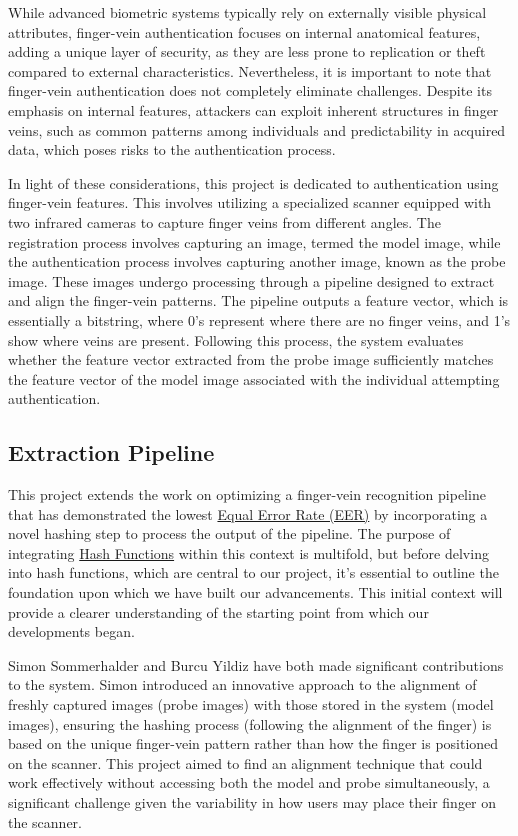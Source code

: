 While advanced biometric systems typically rely on externally visible physical attributes, finger-vein authentication focuses on internal anatomical features, adding a unique layer of security, as they are less prone to replication or theft compared to external characteristics. Nevertheless, it is important to note that finger-vein authentication does not completely eliminate challenges. Despite its emphasis on internal features, attackers can exploit inherent structures in finger veins, such as common patterns among individuals and predictability in acquired data, which poses risks to the authentication process.

In light of these considerations, this project is dedicated to authentication using finger-vein features.
This involves utilizing a specialized scanner equipped with two infrared cameras to capture finger veins from different angles.
The registration process involves capturing an image, termed the model image, while the authentication process involves capturing another image, known as the probe image. These images undergo processing through a pipeline designed to extract and align the finger-vein patterns.
The pipeline outputs a feature vector, which is essentially a bitstring, where 0's represent where there are no finger veins, and 1's show where veins are present.
Following this process, the system evaluates whether the feature vector extracted from the probe image sufficiently matches the feature vector of the model image associated with the individual attempting authentication.

\subsection{Extraction Pipeline}\label{sec:extraction-pipeline}

This project extends the work on optimizing a finger-vein recognition pipeline that has demonstrated the lowest \hyperref[def:EER]{Equal Error Rate (EER)} by incorporating a novel hashing step to process the output of the pipeline. The purpose of integrating \hyperref[def:Hash_Function]{Hash Functions} within this context is multifold, but before delving into hash functions, which are central to our project, it's essential to outline the foundation upon which we have built our advancements. This initial context will provide a clearer understanding of the starting point from which our developments began.

Simon Sommerhalder and Burcu Yildiz have both made significant contributions to the system. Simon introduced an innovative approach to the alignment of freshly captured images (probe images) with those stored in the system (model images), ensuring the hashing process (following the alignment of the finger) is based on the unique finger-vein pattern rather than how the finger is positioned on the scanner. This project aimed to find an alignment technique that could work effectively without accessing both the model and probe simultaneously, a significant challenge given the variability in how users may place their finger on the scanner.


